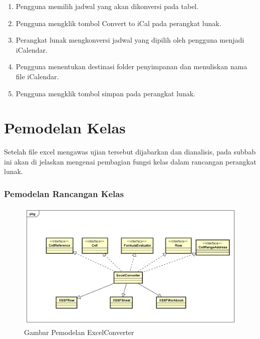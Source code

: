 \begin{enumerate}
	\item Pengguna memilih jadwal yang akan dikonversi pada tabel.
	\item Pengguna mengklik tombol Convert to iCal pada perangkat lunak.
	\item Perangkat lunak mengkonversi jadwal yang dipilih oleh pengguna menjadi iCalendar.
	\item Pengguna menentukan destinasi folder penyimpanan dan menuliskan nama file iCalendar.
	\item Pengguna mengklik tombol simpan pada perangkat lunak.
\end{enumerate}

\section{Pemodelan Kelas}
Setelah file excel mengawas ujian tersebut dijabarkan dan dianalisis, pada subbab ini akan di jelaskan mengenai pembagian fungsi
kelas dalam rancangan perangkat lunak.

\subsubsection{Pemodelan Rancangan Kelas}
\begin{figure}[H]
	\centering
	\includegraphics[scale=0.5]{Gambar/pemodelanExcelConverter}
	\caption{Gambar Pemodelan ExcelConverter}
	\label{fig:pemodelanExcelConverter}
\end{figure}

